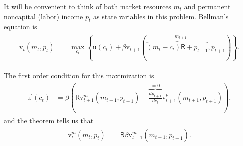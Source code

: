 \documentclass{scrartcl}
\begin{document}
It will be convenient to think of both market resources $\boldsymbol{\mathit{m}}_{t}$ and permanent noncapital (labor) income $\boldsymbol{\mathit{p}}_{t}$ 
as state variables in this problem.
Bellman's equation is 
\begin{equation}\begin{gathered}\begin{aligned}
        \mathrm{v}_{t}(\boldsymbol{\mathit{m}}_{t},\boldsymbol{\mathit{p}}_{t}) & =  \max_{\boldsymbol{\mathit{c}}_{t}} \left\{ \mathrm{u}(\boldsymbol{\mathit{c}}_{t}) + \beta \mathrm{v}_{t+1}\left(\overbrace{(\boldsymbol{\mathit{m}}_{t}-\boldsymbol{\mathit{c}}_{t})\mathsf{R}+\boldsymbol{\mathit{p}}_{t+1}}^{=\boldsymbol{\mathit{m}}_{t+1}},\boldsymbol{\mathit{p}}_{t+1}\right)\right\}.
        \label{eq:vmax}
\end{aligned}\end{gathered}\end{equation}

The first order condition for this maximization is
\begin{equation}\begin{gathered}\begin{aligned}
        \mathrm{u}^{\prime}(\boldsymbol{\mathit{c}}_{t}) & =  \beta \left(\mathsf{R} \mathrm{v}_{t+1}^{\boldsymbol{\mathit{m}}}(\boldsymbol{\mathit{m}}_{t+1},\boldsymbol{\mathit{p}}_{t+1})-\overbrace{\frac{d\boldsymbol{\mathit{p}}_{t+1}}{d \boldsymbol{\mathit{c}}_{t}}}^{=0}\mathrm{v}_{t+1}^{\boldsymbol{\mathit{p}}}(\boldsymbol{\mathit{m}}_{t+1},\boldsymbol{\mathit{p}}_{t+1})\right), \label{eq:upeqrbv}
\end{aligned}\end{gathered}\end{equation}
and the  theorem tells us that
\begin{equation}\begin{gathered}\begin{aligned}
        \mathrm{v}_{t}^{\boldsymbol{\mathit{m}}}(\boldsymbol{\mathit{m}}_{t},\boldsymbol{\mathit{p}}_{t}) & =  \mathsf{R} \beta \mathrm{v}_{t+1}^{\boldsymbol{\mathit{m}}}(\boldsymbol{\mathit{m}}_{t+1},\boldsymbol{\mathit{p}}_{t+1}). \label{eq:vpeqrbv}
\end{aligned}\end{gathered}\end{equation}
\end{document}
